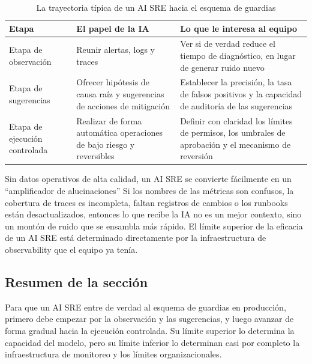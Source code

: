 \begin{table}[H]
\centering
\begin{tabular}{p{} p{} p{}}
\toprule
Etapa & El papel de la IA & Lo que le interesa al equipo \\
\midrule
Etapa de observación & Reunir alertas, logs y traces & Ver si de verdad reduce el tiempo de diagnóstico, en lugar de generar ruido nuevo \\
Etapa de sugerencias & Ofrecer hipótesis de causa raíz y sugerencias de acciones de mitigación & Establecer la precisión, la tasa de falsos positivos y la capacidad de auditoría de las sugerencias \\
Etapa de ejecución controlada & Realizar de forma automática operaciones de bajo riesgo y reversibles & Definir con claridad los límites de permisos, los umbrales de aprobación y el mecanismo de reversión \\
\bottomrule
\end{tabular}
\caption{La trayectoria típica de un AI SRE hacia el esquema de guardias}
\end{table}

\begin{warningbox}{Sin datos operativos de alta calidad, un AI SRE se convierte fácilmente en un ``amplificador de alucinaciones''}
Si los nombres de las métricas son confusos, la cobertura de traces es incompleta, faltan registros de cambios o los runbooks están desactualizados, entonces lo que recibe la IA no es un mejor contexto, sino un montón de ruido que se ensambla más rápido. El límite superior de la eficacia de un AI SRE está determinado directamente por la infraestructura de observability que el equipo ya tenía.
\end{warningbox}

\subsection{Resumen de la sección}

Para que un AI SRE entre de verdad al esquema de guardias en producción, primero debe empezar por la observación y las sugerencias, y luego avanzar de forma gradual hacia la ejecución controlada. Su límite superior lo determina la capacidad del modelo, pero su límite inferior lo determinan casi por completo la infraestructura de monitoreo y los límites organizacionales.
